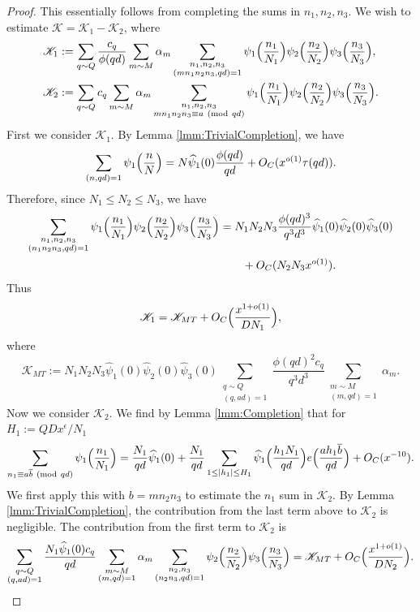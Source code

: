 \documentclass[10pt]{amsart}
\theoremstyle{plain}
\numberwithin{equation}{section}
\newcommand{\Mod}[1]{\ (\mathrm{mod}\ #1)}
\renewcommand{\hat}[1]{\widehat #1}
\begin{document}
\begin{proof}
This essentially follows from completing the sums in $n_1,n_2,n_3$. We wish to estimate $\mathscr{K}=\mathscr{K}_1-\mathscr{K}_2$, where
\begin{align*}
\mathscr{K}_1&:=\sum_{\substack{q\sim Q}}\frac{c_q}{\phi(q d)}\sum_{m\sim M}\alpha_m\sum_{\substack{n_1,n_2,n_3\\ (m n_1n_2n_3,q d)=1}}\psi_1\Bigl(\frac{n_1}{N_1}\Bigr)\psi_2\Bigl(\frac{n_2}{N_2}\Bigr)\psi_3\Bigl(\frac{n_3}{N_3}\Bigr),\\
\mathscr{K}_2&:=\sum_{\substack{q\sim Q}}c_{q}\sum_{m\sim M}\alpha_m\sum_{\substack{n_1,n_2,n_3\\ m n_1n_2n_3\equiv a\Mod{q d}}}\psi_1\Bigl(\frac{n_1}{N_1}\Bigr)\psi_2\Bigl(\frac{n_2}{N_2}\Bigr)\psi_3\Bigl(\frac{n_3}{N_3}\Bigr).
\end{align*}
First we consider $\mathscr{K}_1$. By Lemma \ref{lmm:TrivialCompletion}, we have
\[
\sum_{(n,q d)=1}\psi_1\Bigl(\frac{n}{N}\Bigr)=N\hat{\psi_1(0)}\frac{\phi(q d)}{q d}+O_C(x^{o(1)}\tau(q d)).
\]
Therefore, since $N_1\le N_2\le N_3$, we have
\begin{align*}
\sum_{\substack{n_1,n_2,n_3\\ (n_1n_2n_3,q d)=1}}\psi_1\Bigl(\frac{n_1}{N_1}\Bigr)\psi_2\Bigl(\frac{n_2}{N_2}\Bigr)\psi_3\Bigl(\frac{n_3}{N_3}\Bigr)&=N_1N_2N_3\frac{\phi(q d)^3}{q^3 d^3}\hat{\psi_1}(0)\hat{\psi_2}(0)\hat{\psi_3}(0)\\
&\qquad+O_C(N_2N_3x^{o(1)}).
\end{align*}
Thus
\[
\mathscr{K}_1=\mathscr{K}_{MT}+O_C\Bigl(\frac{x^{1+o(1)}}{D N_1}\Bigr),
\]
where
\[
\mathscr{K}_{MT}:=N_1N_2N_3\hat{\psi_1}(0)\hat{\psi_2}(0)\hat{\psi_3}(0)\sum_{\substack{q\sim Q\\ (q,a d)=1}}\frac{\phi(q d)^2 c_{q}}{q^3 d^3}\sum_{\substack{m\sim M\\ (m,q d)=1}}\alpha_m.
\]
Now we consider $\mathscr{K}_2$. We find by Lemma \ref{lmm:Completion} that for $H_1:=Q D x^\epsilon/N_1$
\[
\sum_{n_1\equiv a\overline{b}\Mod{q d}}\psi_1\Bigl(\frac{n_1}{N_1}\Bigr)=\frac{N_1}{q d}\hat{\psi_1(0)}+\frac{N_1}{q d}\sum_{1\le |h_1|\le H_1}\hat{\psi_1}\Bigl(\frac{h_1 N_1}{q d}\Bigr)e\Bigl(\frac{ah_1\overline{b}}{q d}\Bigr)+O_C(x^{-10}).
\]
We first apply this with $b=m n_2n_3$ to estimate the $n_1$ sum in $\mathscr{K}_2$. By Lemma \ref{lmm:TrivialCompletion}, the contribution from the last term above to $\mathscr{K}_2$ is negligible. The contribution from the first term to $\mathscr{K}_2$ is
\[
\sum_{\substack{q\sim Q\\ (q,ad)=1}}\frac{N_1\hat{\psi_1}(0)c_{q}}{q d}\sum_{\substack{m\sim M\\ (m,q d)=1}}\alpha_m\sum_{\substack{n_2,n_3\\ (n_2 n_3,q d)=1}}\psi_2\Bigl(\frac{n_2}{N_2}\Bigr)\psi_3\Bigl(\frac{n_3}{N_3}\Bigr)=\mathscr{K}_{MT}+O_C\Bigl(\frac{x^{1+o(1)}}{D N_2}\Bigr).
\]
\end{proof}
\end{document}
